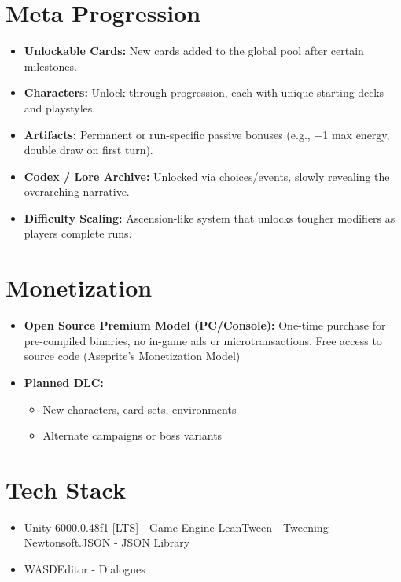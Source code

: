 \documentclass[10pt, a4paper]{article}
\begin{document}
	\section{Meta Progression}
	
	\begin{itemize}
		\item \textbf{Unlockable Cards:} New cards added to the global pool after certain milestones.
		
		\item \textbf{Characters:} Unlock through progression, each with unique starting decks and playstyles.
		
		\item \textbf{Artifacts:} Permanent or run-specific passive bonuses (e.g., +1 max energy, double draw on first turn).
		
		\item \textbf{Codex / Lore Archive:} Unlocked via choices/events, slowly revealing the overarching narrative.
		
		\item \textbf{Difficulty Scaling:} Ascension-like system that unlocks tougher modifiers as players complete runs.
	\end{itemize}
	\section{Monetization}
	
	\begin{itemize}
		\item \textbf{Open Source Premium Model (PC/Console):} One-time purchase for pre-compiled binaries, no in-game ads or microtransactions. Free access to source code (Aseprite's Monetization Model)
		
		\item \textbf{Planned DLC:}
		\begin{itemize}
			\item New characters, card sets, environments
			\item Alternate campaigns or boss variants
		\end{itemize}
	\end{itemize}
	
	\section{Tech Stack}
		\begin{itemize}
			\item Unity 6000.0.48f1 [LTS] - Game Engine
			\subitem LeanTween - Tweening
			\subitem Newtonsoft.JSON - JSON Library
			\item WASDEditor - Dialogues
		\end{itemize}
\end{document}
